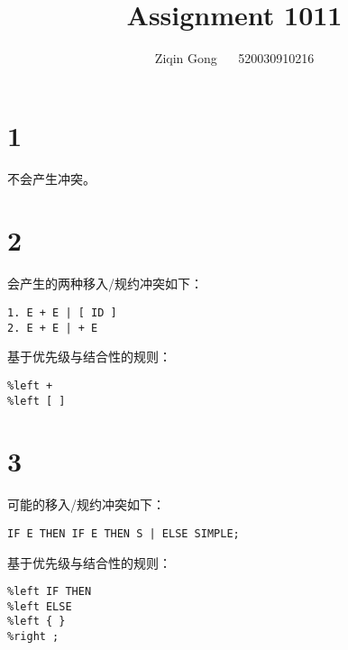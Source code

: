 \documentclass[12pt]{article}
\title{Assignment 1011}
\author{Ziqin Gong $\quad$ 520030910216}
\date{}
\begin{document}
  \maketitle

  \section*{1}

    不会产生冲突。

  \section*{2}
  
    会产生的两种移入/规约冲突如下：
    \begin{lstlisting}
1. E + E | [ ID ]
2. E + E | + E
    \end{lstlisting}

    基于优先级与结合性的规则：
    \begin{lstlisting}
%left +
%left [ ]
    \end{lstlisting}

  \section*{3}
   
    可能的移入/规约冲突如下：
    \begin{lstlisting}
IF E THEN IF E THEN S | ELSE SIMPLE;
    \end{lstlisting}

    基于优先级与结合性的规则：
    \begin{lstlisting}
%left IF THEN
%left ELSE
%left { }
%right ;
    \end{lstlisting}
\end{document}
